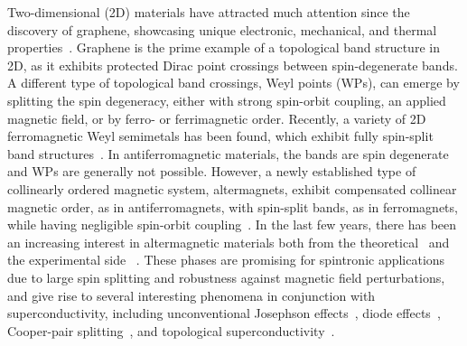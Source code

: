 \documentclass[aps,prb,twocolumn,amsmath,amssymb,floatfix]{revtex4-2}
\begin{document}
\maketitle
\address{$^{\ast}$ These two authors contributed equally.}
Two-dimensional (2D) materials have attracted much attention since the discovery of graphene, showcasing unique electronic, mechanical, and thermal properties~\cite{Geim2009Graphene, Mir2014AnAO}.
Graphene is the prime example of a
topological band structure in 2D,
as it exhibits  protected Dirac point crossings
between spin-degenerate bands.
A different type of topological band crossings, Weyl points (WPs), can emerge by splitting the spin degeneracy, either with strong spin-orbit coupling, an applied magnetic field, or by ferro- or ferrimagnetic order.  
Recently, a variety of 2D ferromagnetic Weyl semimetals has been found, which exhibit fully spin-split band structures~\cite{Niu_2019,Jeon2019FMWP,Shuyuan2020}. In antiferromagnetic materials, the bands are spin degenerate and WPs are generally not possible. 
However, a newly established type of collinearly ordered magnetic system, altermagnets, exhibit compensated collinear magnetic order, as in antiferromagnets, with spin-split bands, as in ferromagnets, while having negligible spin-orbit coupling~\cite{Smejkal22Altermagnetism}. 
In the last few years, there has been an increasing interest in altermagnetic materials
both from the theoretical~\cite{Smejkal22Altermagnetism,Smejkal22Landscape,smejkal_nat_review_22,PhysRevX.12.040002,mcclarty2023landau,PhysRevB.105.064430,PhysRevB.102.144441,doi:10.7566/JPSJ.88.123702,PhysRevLett.132.056701}
and the experimental side
~\cite{zhu_nature_24,krempasky_jungwirth_nature_24,fedchenko_sci_advances_24,nag2023gdalsi,lin2024observation}.
These phases are promising for spintronic applications~\cite{Smejkal22Landscape} due to large spin splitting and robustness against magnetic field perturbations, and give rise to several interesting phenomena in conjunction with superconductivity,
including 
unconventional Josephson effects~\cite{PhysRevLett.131.076003,PhysRevB.108.075425,Zhang2024},
diode effects~\cite{banerjee2024altermagnetic}, Cooper-pair splitting~\cite{giil2024quasiclassical,nagae2024spinpolarized},
and topological superconductivity~\cite{chakraborty2023zerofield,PhysRevB.108.224421,ghorashi2023altermagnetic,PhysRevB.108.205410,PhysRevB.108.184505}.
\end{document}
